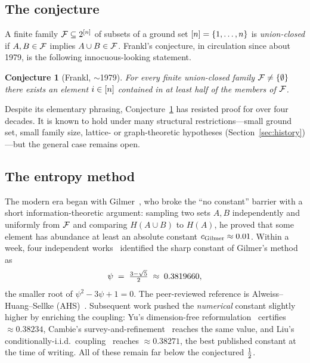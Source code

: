 \documentclass[11pt]{amsart}
\newtheorem{conjecture}[theorem]{Conjecture}
\theoremstyle{definition}
\theoremstyle{remark}
\begin{document}
\subsection{The conjecture}
A finite family $\mathcal{F}\subseteq2^{[n]}$ of subsets of a ground set
$[n]=\{1,\dots,n\}$ is \emph{union-closed} if $A,B\in\mathcal{F}$ implies
$A\cup B\in\mathcal{F}$. Frankl's conjecture, in circulation since about 1979, is the
following innocuous-looking statement.

\begin{conjecture}[Frankl, $\sim$1979]\label{conj:frankl-intro}
For every finite union-closed family $\mathcal{F}\neq\{\emptyset\}$ there exists an
element $i\in[n]$ contained in at least half of the members of $\mathcal{F}$.
\end{conjecture}

Despite its elementary phrasing, Conjecture~\ref{conj:frankl-intro} has resisted
proof for over four decades. It is known to hold under many structural
restrictions---small ground set, small family size, lattice- or graph-theoretic
hypotheses (Section~\ref{sec:history})---but the general case remains open.

\subsection{The entropy method}
The modern era began with Gilmer~\cite{gilmer2022}, who broke the
``no constant'' barrier with a short information-theoretic argument: sampling
two sets $A,B$ independently and uniformly from $\mathcal{F}$ and comparing $H(A\cup B)$
to $H(A)$, he proved that some element has abundance at least an absolute
constant $c_{\text{Gilmer}}\approx 0.01$.
Within a week, four independent works~\cite{sawin2022,chaselovett2022,ahs2023,pebody2022}
identified the sharp constant of Gilmer's method as
\[
   \psi \;=\; \tfrac{3-\sqrt{5}}{2} \;\approx\; 0.3819660,
\]
the smaller root of $\psi^2-3\psi+1=0$. The peer-reviewed reference is
Alweiss--Huang--Sellke (AHS)~\cite{ahs2023}. Subsequent work pushed the
\emph{numerical} constant slightly higher by enriching the coupling: Yu's
dimension-free reformulation~\cite{yu2023} certifies $\approx 0.38234$,
Cambie's survey-and-refinement~\cite{cambie2023} reaches the same value, and
Liu's conditionally-i.i.d.\ coupling~\cite{liu2023} reaches
$\approx 0.38271$,
the best published constant at the time of writing. All of these remain far
below the conjectured $\tfrac{1}{2}$.
\end{document}
